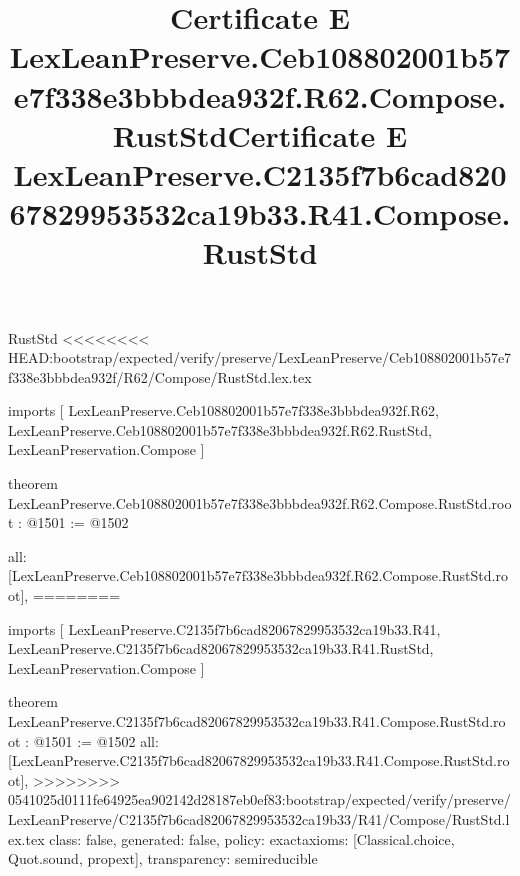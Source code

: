 \begin{lexlean}{RustStd}
<<<<<<<< HEAD:bootstrap/expected/verify/preserve/LexLeanPreserve/Ceb108802001b57e7f338e3bbbdea932f/R62/Compose/RustStd.lex.tex
\title{Certificate E LexLeanPreserve.Ceb108802001b57e7f338e3bbbdea932f.R62.Compose.RustStd}
\begin{coremodule}
imports [
  LexLeanPreserve.Ceb108802001b57e7f338e3bbbdea932f.R62,
  LexLeanPreserve.Ceb108802001b57e7f338e3bbbdea932f.R62.RustStd,
  LexLeanPreservation.Compose
]

theorem LexLeanPreserve.Ceb108802001b57e7f338e3bbbdea932f.R62.Compose.RustStd.root : @1501 := @1502 {
  all: [LexLeanPreserve.Ceb108802001b57e7f338e3bbbdea932f.R62.Compose.RustStd.root],
========
\title{Certificate E LexLeanPreserve.C2135f7b6cad82067829953532ca19b33.R41.Compose.RustStd}
\begin{coremodule}
imports [
  LexLeanPreserve.C2135f7b6cad82067829953532ca19b33.R41,
  LexLeanPreserve.C2135f7b6cad82067829953532ca19b33.R41.RustStd,
  LexLeanPreservation.Compose
]

theorem LexLeanPreserve.C2135f7b6cad82067829953532ca19b33.R41.Compose.RustStd.root : @1501 := @1502 {
  all: [LexLeanPreserve.C2135f7b6cad82067829953532ca19b33.R41.Compose.RustStd.root],
>>>>>>>> 0541025d0111fe64925ea902142d28187eb0ef83:bootstrap/expected/verify/preserve/LexLeanPreserve/C2135f7b6cad82067829953532ca19b33/R41/Compose/RustStd.lex.tex
  class: false,
  generated: false,
  policy: exact{axioms: [Classical.choice, Quot.sound, propext]},
  transparency: semireducible
}


\end{coremodule}}
\end{coremodule}
\end{lexlean}
